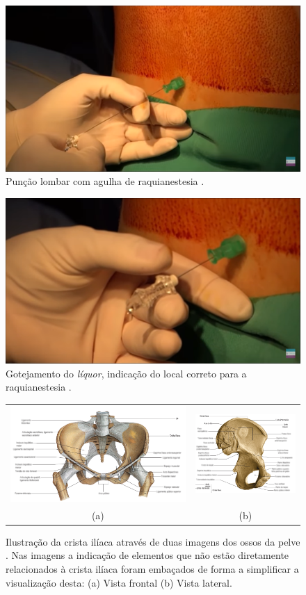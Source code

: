 \begin{figure}[!ht]
   \centering
   \includegraphics[width=0.6\linewidth]{capitulos/figuras/2.PuncaoLombar.png}
   \caption{Punção lombar com agulha de raquianestesia  \cite{Londero2018}.}
   \label{fig:puncaoLombar}
\end{figure}

\begin{figure}[!ht]
   \centering
   \includegraphics[width=0.6\linewidth]{capitulos/figuras/3.GotejamentoLiquor.png}
   \caption{Gotejamento do \textit{líquor}, indicação do local correto para a raquianestesia \cite{Londero2018}.}
   \label{fig:gotejamentoLiquor}
\end{figure}

\begin{figure}[ht!]
    \centering
        \begin{tabular}{cc}
        \includegraphics[width=0.55\linewidth]{capitulos/figuras/crista-iliaca-pelve-ossos-ligamentos.png} & 
        \includegraphics[width=0.35\linewidth]{capitulos/figuras/crista-iliaca-ossos-quadril.png} 
        \\
        (a) & (b)
        \end{tabular}
    \caption{Ilustração da crista ilíaca através de duas imagens dos ossos da pelve \cite{Moura2019}. Nas imagens a indicação de elementos que não estão diretamente relacionados à crista ilíaca foram embaçados de forma a simplificar a visualização desta: (a) Vista frontal (b) Vista lateral.}
    \label{fig:cristaIliaca}
\end{figure}

